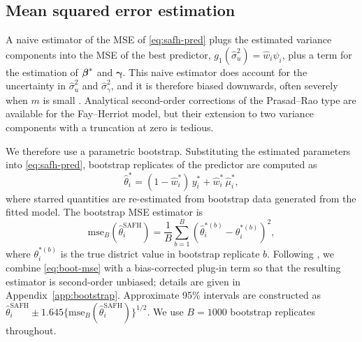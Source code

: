 \subsection{Mean squared error estimation}
\label{sec:mse}

A naive estimator of the MSE of \eqref{eq:safh-pred} plugs the estimated
variance components into the MSE of the best predictor, $g_1(\hat\sigma_u^2) =
\hat w_i \psi_i$, plus a term for the estimation of $\boldsymbol{\beta}^{*}$ and
$\boldsymbol{\gamma}$. This naive estimator does account for the uncertainty
in $\hat\sigma_u^2$ and $\hat\sigma_\gamma^2$, and it is therefore biased
downwards, often severely when $m$ is small \citep{prasad1990estimation}.
Analytical second-order corrections of the Prasad--Rao type are available for
the Fay--Herriot model, but their extension to two variance components with a
truncation at zero is tedious.

We therefore use a parametric bootstrap. Substituting the estimated parameters
into \eqref{eq:safh-pred}, bootstrap replicates of the predictor are computed as
\begin{equation}
  \hat\theta_i^{*} = (1 - \hat w_i^{*})\, y_i^{*} + \hat w_i^{*}\, \hat\mu_i^{*},
  \label{eq:boot-pred}
\end{equation}
where starred quantities are re-estimated from bootstrap data generated from
the fitted model. The bootstrap MSE estimator is
\begin{equation}
  \mathrm{mse}_B(\hat\theta_i^{\mathrm{SAFH}}) = \frac{1}{B} \sum_{b=1}^{B}
  \left( \hat\theta_i^{*(b)} - \theta_i^{*(b)} \right)^2,
  \label{eq:boot-mse}
\end{equation}
where $\theta_i^{*(b)}$ is the true district value in bootstrap replicate $b$.
Following \citet{butar2003measuring}, we combine \eqref{eq:boot-mse} with a
bias-corrected plug-in term so that the resulting estimator is second-order
unbiased; details are given in Appendix~\ref{app:bootstrap}. Approximate 95\%
intervals are constructed as $\hat\theta_i^{\mathrm{SAFH}} \pm 1.645
\{\mathrm{mse}_B(\hat\theta_i^{\mathrm{SAFH}})\}^{1/2}$. We use $B = 1000$
bootstrap replicates throughout.
